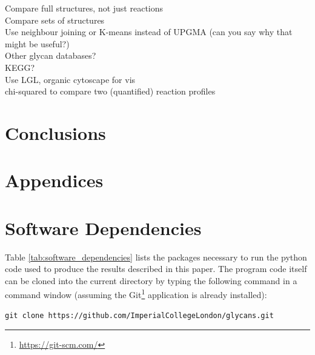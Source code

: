 \documentclass[12pt,a4paper]{article}
\begin{document}
Compare full structures, not just reactions\\

Compare sets of structures\\

Use neighbour joining or K-means instead of UPGMA (can you say why that might be useful?)\\

Other glycan databases?\\

KEGG?\\

Use LGL, organic cytoscape for vis\\

chi-squared to compare two (quantified) reaction profiles\\

\newpage
\section{Conclusions}
\label{sec:conclusions}

\newpage
\section*{Appendices}
\appendix
\section{Software Dependencies}
\label{sec:software_dependencies}
Table \ref{tab:software_dependencies} lists the packages necessary to run the python code used to produce the results described in this paper. The program code itself can be cloned into the current directory by typing the following command in a command window (assuming the Git\footnote{\url{https://git-scm.com/}} application is already installed):

\begin{verbatim}
git clone https://github.com/ImperialCollegeLondon/glycans.git
\end{verbatim}
\end{document}

